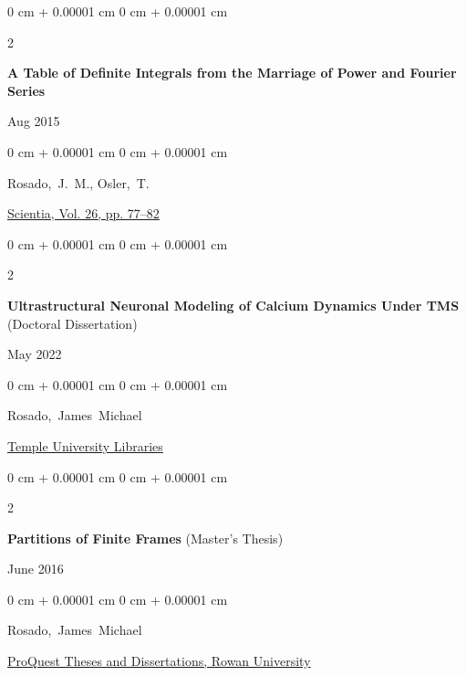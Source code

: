 \documentclass[10pt, letterpaper]{article}
\newenvironment{onecolentry}{
    \begin{adjustwidth}{
        0 cm + 0.00001 cm
    }{
        0 cm + 0.00001 cm
    }
}{
    \end{adjustwidth}
} %
\newenvironment{twocolentry}[2][]{
    \onecolentry
    \def\secondColumn{#2}
    \setcolumnwidth{\fill, 4.5 cm}
    \begin{paracol}{2}
}{
    \switchcolumn \raggedleft \secondColumn
    \end{paracol}
    \endonecolentry
} %
\begin{document}
\vspace{0.3 cm}

\begin{samepage}
    \begin{twocolentry}{
        Aug 2015
    }
        \textbf{A Table of Definite Integrals from the Marriage of Power and Fourier Series}
    \end{twocolentry}

    \vspace{0.10 cm}

    \begin{onecolentry}
        \mbox{Rosado, J. M.}, \mbox{Osler, T.}

        \vspace{0.10 cm}

        \href{https://scientia.wpunj.edu/issue/view/24}{Scientia, Vol. 26, pp. 77–82}
    \end{onecolentry}
\end{samepage}

\vspace{0.3 cm}

\begin{samepage}
    \begin{twocolentry}{
        May 2022
    }
        \textbf{Ultrastructural Neuronal Modeling of Calcium Dynamics Under TMS} (Doctoral Dissertation)
    \end{twocolentry}

    \vspace{0.10 cm}

    \begin{onecolentry}
        \mbox{Rosado, James Michael}

        \vspace{0.10 cm}

        \href{https://digital.library.temple.edu/digital/collection/p245801coll10/id/620358}{Temple University Libraries}
    \end{onecolentry}
\end{samepage}

\vspace{0.3 cm}

\begin{samepage}
    \begin{twocolentry}{
        June 2016
    }
        \textbf{Partitions of Finite Frames} (Master's Thesis)
    \end{twocolentry}

    \vspace{0.10 cm}

    \begin{onecolentry}
        \mbox{Rosado, James Michael}

        \vspace{0.10 cm}

        \href{https://www.proquest.com/openview/845a0ac5c3c9c4b7ebd6d1669d1c83ef}{ProQuest Theses and Dissertations, Rowan University}
    \end{onecolentry}
\end{samepage}
\end{document}
